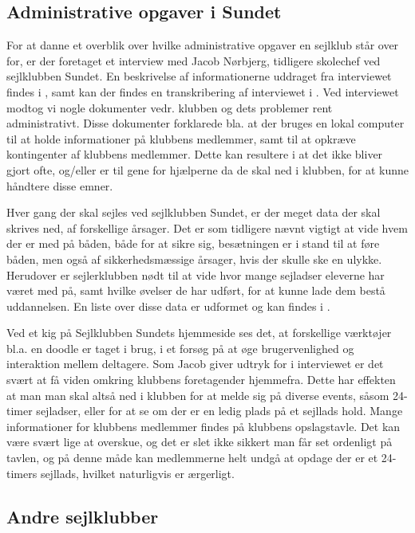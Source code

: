 \subsection{Administrative opgaver i Sundet}

For at danne et overblik over hvilke administrative opgaver en sejlklub står over for, er der foretaget et interview med
Jacob Nørbjerg, tidligere skolechef ved sejlklubben Sundet. En beskrivelse af informationerne uddraget fra interviewet
findes i , samt kan der findes en transkribering af interviewet i
. Ved interviewet modtog vi nogle dokumenter vedr. klubben og dets problemer
rent administrativt. Disse dokumenter forklarede bla. at der bruges en lokal computer til at holde informationer på klubbens
medlemmer, samt til at opkræve kontingenter af klubbens medlemmer. Dette kan resultere i at det ikke bliver gjort ofte,
og/eller er til gene for hjælperne da de skal ned i klubben, for at kunne håndtere disse emner.

Hver gang der skal sejles ved sejlklubben Sundet, er der meget data der skal skrives ned, af forskellige årsager. Det er
som tidligere nævnt vigtigt at vide hvem der er med på båden, både for at sikre sig, besætningen er i stand til at føre
båden, men også af sikkerhedsmæssige årsager, hvis der skulle ske en ulykke. Herudover er sejlerklubben nødt til at vide
hvor mange sejladser eleverne har været med på, samt hvilke øvelser de har udført, for at kunne lade dem bestå
uddannelsen. En liste over disse data er udformet og kan findes i .

Ved et kig på Sejlklubben Sundets hjemmeside \citep{SundetUdlaan} ses det, at forskellige værktøjer bl.a. en doodle er
taget i brug, i et forsøg på at øge brugervenlighed og interaktion mellem deltagere. Som Jacob giver udtryk for i
interviewet er det svært at få viden omkring klubbens foretagender hjemmefra. Dette har effekten at man man skal altså
ned i klubben for at melde sig på diverse events, såsom 24-timer sejladser, eller for at se om der er en ledig plads på
et sejllads hold. Mange informationer for klubbens medlemmer findes på klubbens opslagstavle. Det kan være svært lige at
overskue, og det er slet ikke sikkert man får set ordenligt på tavlen, og på denne måde kan medlemmerne helt undgå at
opdage der er et 24-timers sejllads, hvilket naturligvis er ærgerligt.

\subsection{Andre sejlklubber}

